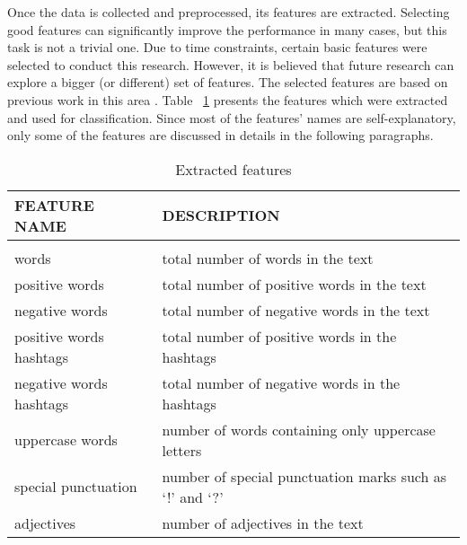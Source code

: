 
Once the data is collected and preprocessed, its features are extracted. Selecting good features can significantly improve the performance in many cases, but this task is not a trivial one. Due to time constraints, certain basic features were selected to conduct this research. However, it is believed that future research can explore a bigger (or different) set of features. The selected features are based on previous work in this area \cite{fairytales}. Table ~\ref{featuretable} presents the features which were extracted and used for classification. Since most of the features' names are self-explanatory, only some of the features are discussed in details in the following paragraphs.


\begin{table}[h!]
\caption{Extracted features}

\begin{center}
\begin{tabular}{ll}
\multicolumn{1}{l}{\bf FEATURE NAME}  &\multicolumn{1}{l}{\bf DESCRIPTION}
\\ \hline \\
words & total number of words in the text \\
positive words & total number of positive words in the text \\
negative words & total number of negative words in the text \\
positive words hashtags & total number of positive words in the hashtags \\
negative words hashtags & total number of negative words in the hashtags \\
uppercase words & number of words containing only uppercase letters \\
special punctuation & number of special punctuation marks such as `!' and `?' \\
adjectives & number of adjectives in the text 
\end{tabular}{}
\label{featuretable}
\end{center}
\end{table}




